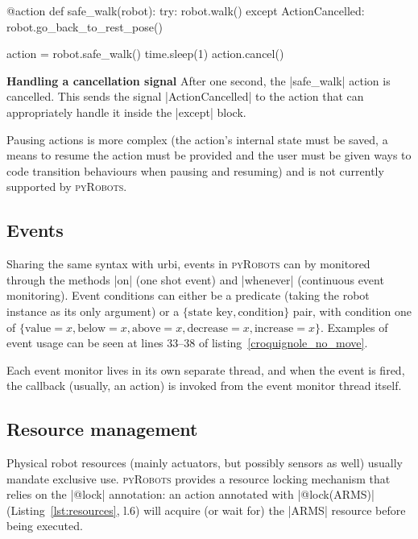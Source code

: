 \documentclass[letterpaper, 10pt, conference]{ieeeconf}      %
\newcommand{\pyRobots}{\textsc{pyRobots}}
\begin{document}
\begin{listing}
\begin{pythoncode}
    @action
    def safe_walk(robot):
      try:
        robot.walk()
      except ActionCancelled:
        robot.go_back_to_rest_pose()

    action = robot.safe_walk()
    time.sleep(1)
    action.cancel()
\end{pythoncode}
\caption{\textbf{Handling a cancellation signal} After one second, the
\python|safe_walk| action is cancelled. This sends the signal
\python|ActionCancelled| to the action that can appropriately handle it inside
the \python|except| block.}
\label{lst:signals}
\end{listing}

Pausing actions is more complex (the action's internal state must be saved, a
means to resume the action must be provided and the user must be given ways to
code transition behaviours when pausing and resuming) and is not currently
supported by \pyRobots{}.

\subsection{Events}

Sharing the same syntax with {\sc urbi}, events in \pyRobots{} can by monitored
through the methods \python|on| (one shot event) and \python|whenever|
(continuous event monitoring). Event conditions can either be a predicate
(taking the robot instance as its only argument) or a $\{\text{state
key}, \text{condition}\}$ pair, with condition one of $\{\text{value}=x,
\text{below}=x, \text{above}=x, \text{decrease}=x, \text{increase}=x\}$.
Examples of event usage can be seen at lines 33--38 of
listing~\ref{croquignole_no_move}.

Each event monitor lives in its own separate thread, and when the event is fired,
the callback (usually, an action) is invoked from the event monitor thread
itself.

\subsection{Resource management}

Physical robot resources (mainly actuators, but possibly sensors as
well) usually mandate exclusive use. \pyRobots{} provides a resource
locking mechanism that relies on the \python|@lock| annotation: an action
annotated with \python|@lock(ARMS)| (Listing~\ref{lst:resources}, l.6) will
acquire (or wait for) the \python|ARMS| resource before being executed.
\end{document}
